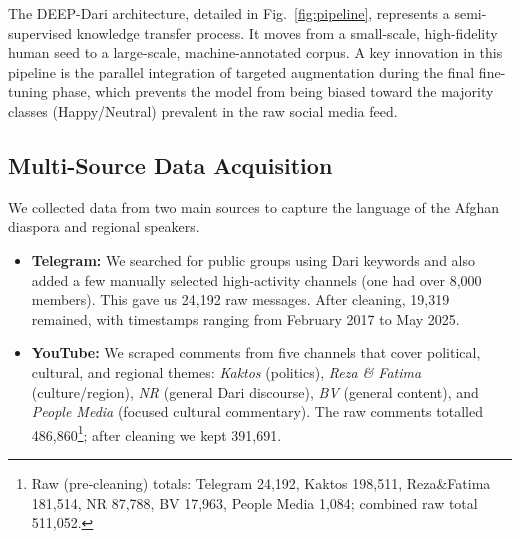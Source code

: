 \documentclass[runningheads]{llncs}
\begin{document}
The DEEP-Dari architecture, detailed in Fig.~\ref{fig:pipeline}, represents a semi-supervised knowledge transfer process. It moves from a small-scale, high-fidelity human seed to a large-scale, machine-annotated corpus. A key innovation in this pipeline is the parallel integration of targeted augmentation during the final fine-tuning phase, which prevents the model from being biased toward the majority classes (Happy/Neutral) prevalent in the raw social media feed.
\subsection{Multi-Source Data Acquisition}
We collected data from two main sources to capture the language of the Afghan diaspora and regional speakers.

\begin{itemize}
    \item \textbf{Telegram:} We searched for public groups using Dari keywords and also added a few manually selected high‑activity channels (one had over 8,000 members). This gave us 24,192 raw messages. After cleaning, 19,319 remained, with timestamps ranging from February 2017 to May 2025.
    \item \textbf{YouTube:} We scraped comments from five channels that cover political, cultural, and regional themes: \textit{Kaktos} (politics), \textit{Reza \& Fatima} (culture/region), \textit{NR} (general Dari discourse), \textit{BV} (general content), and \textit{People Media} (focused cultural commentary). The raw comments totalled 486,860\footnote{Raw (pre‑cleaning) totals: Telegram 24,192, Kaktos 198,511, Reza\&Fatima 181,514, NR 87,788, BV 17,963, People Media 1,084; combined raw total 511,052.}; after cleaning we kept 391,691.
\end{itemize}
\end{document}
